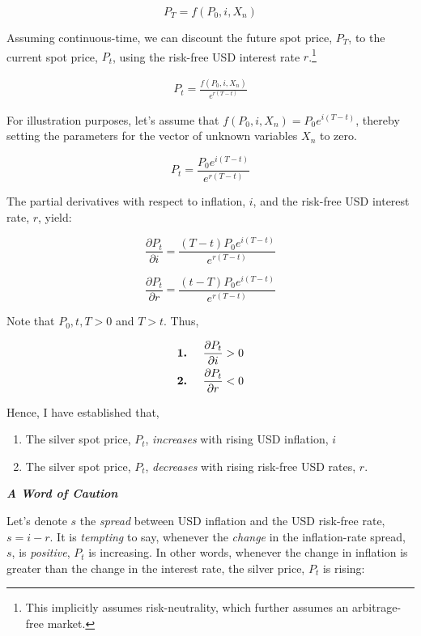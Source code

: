 \documentclass[
  12pt,
]{article}
\providecommand{\tightlist}{%
  \setlength{\itemsep}{0pt}\setlength{\parskip}{0pt}}
\begin{document}
\[P_{T} = f(P_{0}, i, X_n)\]

Assuming continuous-time, we can discount the future spot price,
\(P_T\), to the current spot price, \(P_t\), using the risk-free USD
interest rate \(r\).\footnote{This implicitly assumes risk-neutrality,
  which further assumes an arbitrage-free market.}

\begin{align}
P_t = \frac{f(P_{0}, i, X_n)}{e^{r(T-t)}}
\end{align}

For illustration purposes, let's assume that
\(f(P_0, i, X_n) = P_0 e^{i(T-t)}\), thereby setting the parameters for
the vector of unknown variables \(X_n\) to zero.

\[P_t = \frac{P_0 e^{i(T-t)}}{e^{r(T-t)}}\]

The partial derivatives with respect to inflation, \(i\), and the
risk-free USD interest rate, \(r\), yield:

\[\frac{\partial P_{t}}{\partial i} = \frac{(T-t)P_0 e^{i(T-t)}}{e^{r(T-t)}}\]

\[\frac{\partial P_{t}}{\partial r} = \frac{(t-T)P_0 e^{i(T-t)}}{e^{r(T-t)}}\]

Note that \(P_0, t, T > 0\) and \(T>t\). Thus,

\begin{align}
\textbf{1.} \hspace{5mm} \frac{\partial P_{t}}{\partial i} &> 0 \notag\\
\textbf{2.} \hspace{5mm} \frac{\partial P_{t}}{\partial r} &< 0 \notag
\end{align}

Hence, I have established that,

\begin{enumerate}
\def\labelenumi{\arabic{enumi}.}
\tightlist
\item
  The silver spot price, \(P_t\), \emph{increases} with rising USD
  inflation, \(i\)
\item
  The silver spot price, \(P_t\), \emph{decreases} with rising risk-free
  USD rates, \(r\).
\end{enumerate}

\vspace{5 mm}

\textbf{\emph{A Word of Caution}}

Let's denote \(s\) the \emph{spread} between USD inflation and the USD
risk-free rate, \(s = i - r\). It is \emph{tempting} to say, whenever
the \emph{change} in the inflation-rate spread, \(s\), is
\emph{positive}, \(P_t\) is increasing. In other words, whenever the
change in inflation is greater than the change in the interest rate, the
silver price, \(P_t\) is rising:
\end{document}
